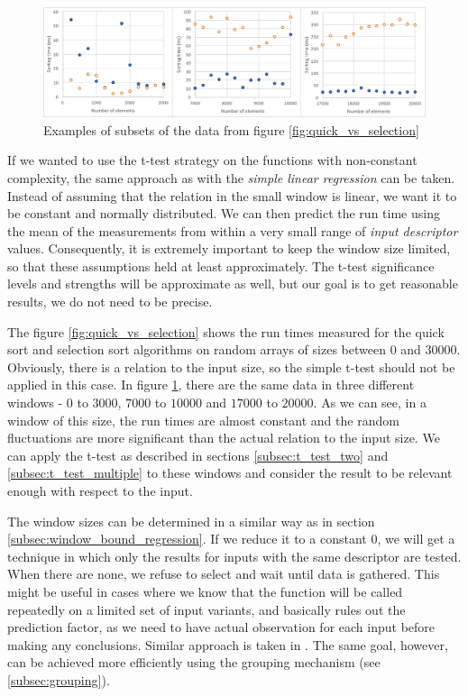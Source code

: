 \begin{figure}[h!]
	\captionsetup{justification=centering,margin=0.5cm}
	\centerline{\mbox{\includegraphics[width=150mm]{./img/window_t_test_examples.png}}}
	\caption{Examples of subsets of the data from figure \ref{fig:quick_vs_selection}}
	\label{fig:window_t_test_examples}
\end{figure}

If we wanted to use the t-test strategy on the functions with non-constant complexity, the same approach as with the \textit{simple linear regression} can be taken. Instead of assuming that the relation in the small window is linear, we want it to be constant and normally distributed. We can then predict the run time using the mean of the measurements from within a very small range of \textit{input descriptor} values. Consequently, it is extremely important to keep the window size limited, so that these assumptions held at least approximately. The t-test significance levels and strengths will be approximate as well, but our goal is to get reasonable results, we do not need to be precise.

The figure \ref{fig:quick_vs_selection} shows the run times measured for the quick sort and selection sort algorithms on random arrays of sizes between $0$ and $30000$. Obviously, there is a relation to the input size, so the simple t-test should not be applied in this case. In figure \ref{fig:window_t_test_examples}, there are the same data in three different windows - $0$ to $3000$, $7000$ to $10000$ and $17000$ to $20000$. As we can see, in a window of this size, the run times are almost constant and the random fluctuations are more significant than the actual relation to the input size. We can apply the t-test as described in sections \ref{subsec:t_test_two} and \ref{subsec:t_test_multiple} to these windows and consider the result to be relevant enough with respect to the input.

The window sizes can be determined in a similar way as in section \ref{subsec:window_bound_regression}. If we reduce it to a constant 0, we will get a technique in which only the results for inputs with the same descriptor are tested. When there are none, we refuse to select and wait until data is gathered. This might be useful in cases where we know that the function will be called repeatedly on a limited set of input variants, and basically rules out the prediction factor, as we need to have actual observation for each input before making any conclusions. Similar approach is taken in \cite{bulej_performance_2012}. The same goal, however, can be achieved more efficiently using the grouping mechanism (see \ref{subsec:grouping}).

